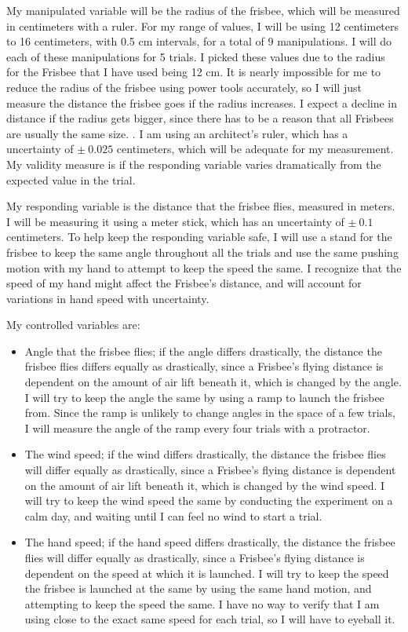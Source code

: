 \documentclass{article}
\begin{document}
My manipulated variable will be the radius of the frisbee, which will be
measured in centimeters with a ruler. For my range of values, I will be
using 12 centimeters to 16 centimeters, with 0.5 cm intervals, for a
total of 9 manipulations. I will do each of these manipulations for 5
trials. I picked these values due to the radius for the Frisbee that I
have used being 12 cm. It is nearly impossible for me to reduce the
radius of the frisbee using power tools accurately, so I will just
measure the distance the frisbee goes if the radius increases. I expect
a decline in distance if the radius gets bigger, since there has to be a
reason that all Frisbees are usually the same size. . I am using an
architect's ruler, which has a uncertainty of \(\pm \ 0.025\)
centimeters, which will be adequate for my measurement. My validity
measure is if the responding variable varies dramatically from the
expected value in the trial.

My responding variable is the distance that the frisbee flies, measured
in meters. I will be measuring it using a meter stick, which has an
uncertainty of \(\pm \ 0.1\) centimeters. To help keep the responding
variable safe, I will use a stand for the frisbee to keep the same angle
throughout all the trials and use the same pushing motion with my hand
to attempt to keep the speed the same. I recognize that the speed of my
hand might affect the Frisbee's distance, and will account for
variations in hand speed with uncertainty.

My controlled variables are:

\begin{itemize}
\tightlist
\item
  Angle that the frisbee flies; if the angle differs drastically, the
  distance the frisbee flies differs equally as drastically, since a
  Frisbee's flying distance is dependent on the amount of air lift
  beneath it, which is changed by the angle. I will try to keep the
  angle the same by using a ramp to launch the frisbee from. Since the
  ramp is unlikely to change angles in the space of a few trials, I will
  measure the angle of the ramp every four trials with a protractor.
\item
  The wind speed; if the wind differs drastically, the distance the
  frisbee flies will differ equally as drastically, since a Frisbee's
  flying distance is dependent on the amount of air lift beneath it,
  which is changed by the wind speed. I will try to keep the wind speed
  the same by conducting the experiment on a calm day, and waiting until
  I can feel no wind to start a trial.
\item
  The hand speed; if the hand speed differs drastically, the distance
  the frisbee flies will differ equally as drastically, since a
  Frisbee's flying distance is dependent on the speed at which it is
  launched. I will try to keep the speed the frisbee is launched at the
  same by using the same hand motion, and attempting to keep the speed
  the same. I have no way to verify that I am using close to the exact
  same speed for each trial, so I will have to eyeball it.
\end{itemize}
\end{document}
